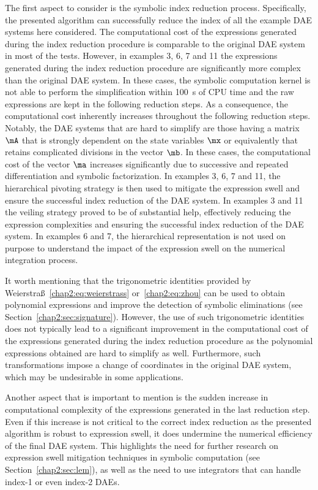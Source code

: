 The first aspect to consider is the symbolic index reduction process. Specifically, the presented algorithm can successfully reduce the index of all the example \ac{DAE} systems here considered. The computational cost of the expressions generated during the index reduction procedure is comparable to the original \ac{DAE} system in most of the tests. However, in examples 3, 6, 7 and 11 the expressions generated during the index reduction procedure are significantly more complex than the original \ac{DAE} system. In these cases, the \Maple{} symbolic computation kernel is not able to perform the simplification within \SI{100}{\second} of CPU time and the raw expressions are kept in the following reduction steps. As a consequence, the computational cost inherently increases throughout the following reduction steps. Notably, the \ac{DAE} systems that are hard to simplify are those having a matrix $\mA$ that is strongly dependent on the state variables $\mx$ or equivalently that retains complicated divisions in the vector $\mb$. In these cases, the computational cost of the vector $\ma$ increases significantly due to successive and repeated differentiation and symbolic factorization. In examples 3, 6, 7 and 11, the hierarchical pivoting strategy is then used to mitigate the expression swell and ensure the successful index reduction of the \ac{DAE} system. In examples 3 and 11 the veiling strategy proved to be of substantial help, effectively reducing the expression complexities and ensuring the successful index reduction of the \ac{DAE} system. In examples 6 and 7, the hierarchical representation is not used on purpose to understand the impact of the expression swell on the numerical integration process.

It worth mentioning that the trigonometric identities provided by Weierstra{\ss}~\eqref{chap2:eq:weierstrass} or~\eqref{chap2:eq:zhou} can be used to obtain polynomial expressions and improve the detection of symbolic eliminations (see Section~\ref{chap2:sec:signature}). However, the use of such trigonometric identities does not typically lead to a significant improvement in the computational cost of the expressions generated during the index reduction procedure as the polynomial expressions obtained are hard to simplify as well. Furthermore, such transformations impose a change of coordinates in the original \ac{DAE} system, which may be undesirable in some applications.

Another aspect that is important to mention is the sudden increase in computational complexity of the expressions generated in the last reduction step. Even if this increase is not critical to the correct index reduction as the presented algorithm is robust to expression swell, it does undermine the numerical efficiency of the final \ac{DAE} system. This highlights the need for further research on expression swell mitigation techniques in symbolic computation (see Section~\ref{chap2:sec:lem}), as well as the need to use integrators that can handle index-1 or even index-2 \acp{DAE}.

